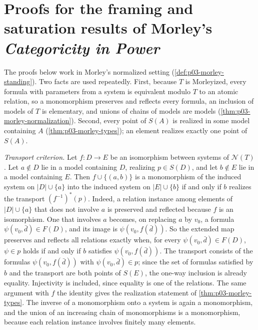 \section{Proofs for the framing and saturation results of Morley's \emph{Categoricity in Power}}
\label{sec:annex-p03-w03-p03-034}

The proofs below work in Morley's normalized setting
(\cref{def:p03-morley-standing}). Two facts are used repeatedly. First,
because \(T\) is Morleyized, every formula with parameters from a system is
equivalent modulo \(T\) to an atomic relation, so a monomorphism preserves
and reflects every formula, an inclusion of models of \(T\) is elementary,
and unions of chains of models are models
(\cref{thm:p03-morley-normalization}). Second, every point of \(S(A)\) is
realized in some model containing \(A\) (\cref{thm:p03-morley-types}); an
element realizes exactly one point of \(S(A)\).

\emph{Transport criterion.} Let \(f:D\to E\) be an isomorphism between
systems of \(\mathcal N(T)\). Let \(a\notin D\) lie in a model containing
\(D\), realizing \(p\in S(D)\), and let \(b\notin E\) lie in a model
containing \(E\). Then \(f\cup\{(a,b)\}\) is a monomorphism of the induced
system on \(|D|\cup\{a\}\) into the induced system on \(|E|\cup\{b\}\) if and
only if \(b\) realizes the transport \((f^{-1})^*(p)\). Indeed, a relation
instance among elements of \(|D|\cup\{a\}\) that does not involve \(a\) is
preserved and reflected because \(f\) is an isomorphism. One that involves
\(a\) becomes, on replacing \(a\) by \(v_0\), a formula
\(\psi(v_0,\bar d)\in F(D)\), and its image is \(\psi(v_0,f(\bar d))\). So
the extended map preserves and reflects all relations exactly when, for
every \(\psi(v_0,\bar d)\in F(D)\), \(\psi\in p\) holds if and only if \(b\)
satisfies \(\psi(v_0,f(\bar d))\). The transport consists of the formulas
\(\psi(v_0,f(\bar d))\) with \(\psi(v_0,\bar d)\in p\); since the set of
formulas satisfied by \(b\) and the transport are both points of \(S(E)\),
the one-way inclusion is already equality. Injectivity is included, since
equality is one of the relations. The same argument with \(f\) the identity
gives the realization statement of \cref{thm:p03-morley-types}. The
inverse of a monomorphism onto a system is again a monomorphism, and the
union of an increasing chain of monomorphisms is a monomorphism, because
each relation instance involves finitely many elements.

